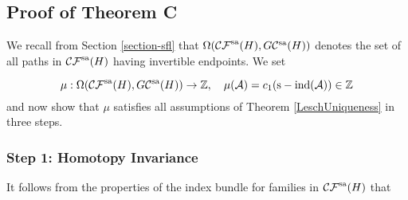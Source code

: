 \documentclass[a4paper,10pt]{article}
\DeclareMathOperator{\sind}{s-ind}
\DeclareMathOperator{\sfl}{sf}
\begin{document}



\subsection{Proof of Theorem C}
We recall from Section \ref{section-sfl} that $\Omega(\mathcal{CF}^\textup{sa}(H),G\mathcal{C}^\textup{sa}(H))$ denotes the set of all paths in $\mathcal{CF}^\textup{sa}(H)$ having invertible endpoints. We set

\[\mu:\Omega(\mathcal{CF}^\textup{sa}(H),G\mathcal{C}^\textup{sa}(H))\rightarrow\mathbb{Z},\quad \mu(\mathcal{A})=c_1(\sind(\mathcal{A}))\in\mathbb{Z}\]
and now show that $\mu$ satisfies all assumptions of Theorem \ref{LeschUniqueness} in three steps.


\subsubsection*{Step 1: Homotopy Invariance}
It follows from the properties of the index bundle for families in $\mathcal{CF}^\textup{sa}(H)$ that 
\end{document}
